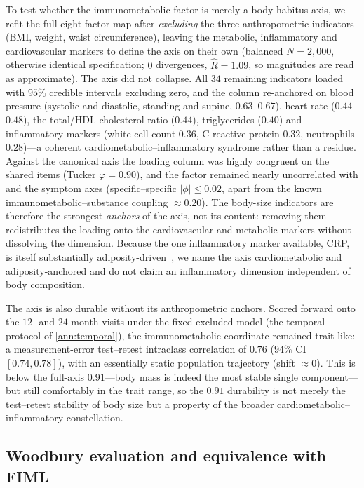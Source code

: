 To test whether the immunometabolic factor is merely a body-habitus axis, we refit the full
eight-factor map after \emph{excluding} the three anthropometric indicators (BMI, weight,
waist circumference), leaving the metabolic, inflammatory and cardiovascular markers to define
the axis on their own (balanced $N=2{,}000$, otherwise identical specification; $0$
divergences, $\hat R=1.09$, so magnitudes are read as approximate). The axis did not collapse.
All $34$ remaining indicators loaded with $95\%$ credible intervals excluding zero, and the
column re-anchored on blood pressure (systolic and diastolic, standing and supine,
$0.63$--$0.67$), heart rate ($0.44$--$0.48$), the total/HDL cholesterol ratio ($0.44$),
triglycerides ($0.40$) and inflammatory markers (white-cell count $0.36$, C-reactive protein
$0.32$, neutrophils $0.28$)---a coherent cardiometabolic--inflammatory syndrome rather than a
residue. Against the canonical axis the loading column was highly congruent on the shared
items (Tucker $\varphi=0.90$), and the factor remained nearly uncorrelated with \Gfac{} and the
symptom axes (specific--specific $|\phi|\le 0.02$, apart from the known immunometabolic--substance
coupling $\approx 0.20$). The body-size indicators are therefore the strongest \emph{anchors}
of the axis, not its content: removing them redistributes the loading onto the cardiovascular
and metabolic markers without dissolving the dimension. Because the one inflammatory marker
available, CRP, is itself substantially adiposity-driven~\citep{kappelmann2021,norton2025crp,ye2021inflammation},
we name the axis cardiometabolic and adiposity-anchored and do not claim an inflammatory
dimension independent of body composition.

The axis is also durable without its anthropometric anchors. Scored forward onto the
$12$- and $24$-month visits under the fixed excluded model (the temporal protocol of
\ref{ann:temporal}), the immunometabolic coordinate remained trait-like: a
measurement-error test--retest intraclass correlation of $0.76$ ($94\%$ CI $[0.74,0.78]$),
with an essentially static population trajectory (shift $\approx 0$). This is below the
full-axis $0.91$---body mass is indeed the most stable single component---but still
comfortably in the trait range, so the $0.91$ durability is not merely the test--retest
stability of body size but a property of the broader cardiometabolic--inflammatory
constellation.

\subsection{Woodbury evaluation and equivalence with FIML}
\label{annA:woodbury}

